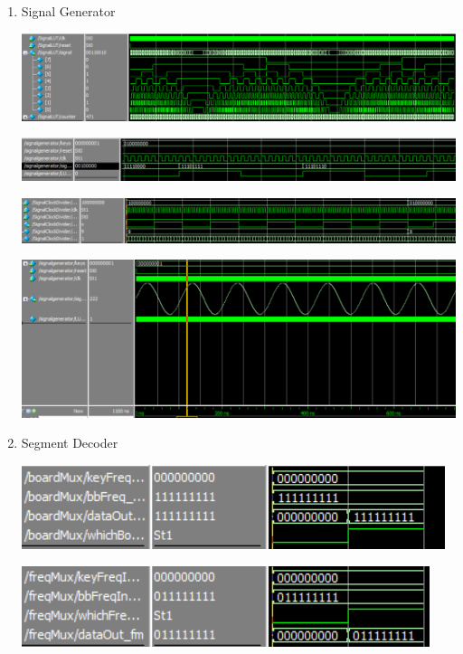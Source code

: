 \documentclass[a4paper]{article}
\begin{document}
\begin{enumerate}

\item Signal Generator

\includegraphics[width=6 in]{./Images/chasePictures/SIgnalLUTSimulation.PNG}

\includegraphics[width=6 in]{./Images/chasePictures/SignalGeneratorSimulation.PNG}

\includegraphics[width=6 in]{./Images/chasePictures/SignalClockDividerSimulation.PNG}

\includegraphics[width=6 in]{./Images/chasePictures/SignalGeneratorSimulationSine.PNG}

\item Segment Decoder

\includegraphics[width=6 in]{./Images/boardMuxSimulation.PNG}

\includegraphics[width=6 in]{./Images/freqMuxSimulation.PNG}


\end{enumerate}
\end{document}
